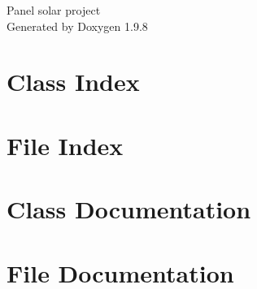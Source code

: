 \documentclass[twoside]{book}
\newcommand{\+}{\discretionary{\mbox{\scriptsize$\hookleftarrow$}}{}{}}
\newcommand{\clearemptydoublepage}{%
    \newpage{\pagestyle{empty}\cleardoublepage}%
  }
\begin{document}
  \raggedbottom
    \hypersetup{pageanchor=false,
                bookmarksnumbered=true,
                pdfencoding=unicode
               }
  \begin{titlepage}
  \vspace*{7cm}
  \begin{center}%
  {\Large Panel solar project}\\
  \vspace*{1cm}
  {\large Generated by Doxygen 1.9.8}\\
  \end{center}
  \end{titlepage}
  \clearemptydoublepage
  \tableofcontents
  \clearemptydoublepage
  \hypersetup{pageanchor=true}
\chapter{Class Index}

\chapter{File Index}

\chapter{Class Documentation}

\chapter{File Documentation}

  \backmatter
  \newpage
  \clearemptydoublepage
  \printindex
\end{document}
